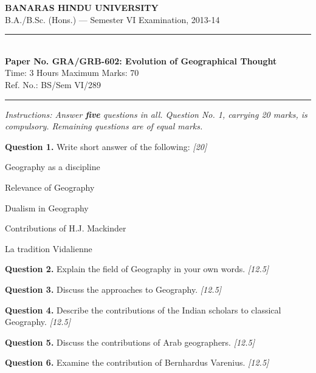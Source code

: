 \documentclass[11pt,a4paper]{article}
\newcommand{\pts}[1]{\hfill   \textit{[#1]}}
\begin{document}
\begin{center}
  {\large\bfseries BANARAS HINDU UNIVERSITY}\\[2pt]
  {\normalsize B.A./B.Sc. (Hons.) --- Semester VI Examination, 2013-14}\\[6pt]
  \rule{0.8\linewidth}{0.5pt}\\[6pt]
  {\large\bfseries Paper No. GRA/GRB-602: Evolution of Geographical Thought}\\[4pt]
  {\normalsize Time: 3 Hours \hfill Maximum Marks: 70}\\[2pt]
  {\small Ref. No.: BS/Sem VI/289}
\end{center}
\rule{\linewidth}{0.4pt}
\smallskip



\noindent   \textit{Instructions: Answer   \textbf{five} questions in all. Question No. 1, carrying 20 marks, is compulsory. Remaining questions are of equal marks.}
\bigskip




\noindent   \textbf{Question 1.} Write short answer of the following: \pts{20}

\begin{parts}
  \item Geography as a discipline
  \item Relevance of Geography
  \item Dualism in Geography
  \item Contributions of H.J. Mackinder
  \item La tradition Vidalienne
\end{parts}

\medskip


\noindent   \textbf{Question 2.} Explain the field of Geography in your own words. \pts{12.5}

\medskip


\noindent   \textbf{Question 3.} Discuss the approaches to Geography. \pts{12.5}

\medskip


\noindent   \textbf{Question 4.} Describe the contributions of the Indian scholars to classical Geography. \pts{12.5}

\medskip


\noindent   \textbf{Question 5.} Discuss the contributions of Arab geographers. \pts{12.5}

\medskip


\noindent   \textbf{Question 6.} Examine the contribution of Bernhardus Varenius. \pts{12.5}
\end{document}

